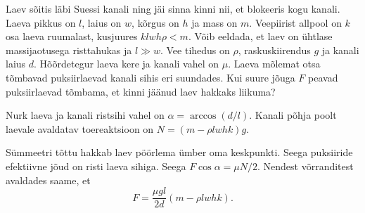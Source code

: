 
Laev sõitis läbi Suessi kanali ning jäi sinna kinni nii, et blokeeris kogu kanali. Laeva pikkus on $l$, laius on $w$, kõrgus on $h$ ja mass on $m$. Veepiirist allpool on $k$ osa laeva ruumalast, kusjuures $klwh\rho < m$. Võib eeldada, et laev on ühtlase massijaotusega risttahukas ja $l \gg w$. Vee tihedus on $\rho$, raskuskiirendus $g$ ja kanali laius $d$. Hõõrdetegur laeva kere ja kanali vahel on $\mu$. Laeva mõlemat otsa tõmbavad puksiirlaevad kanali sihis eri suundades. Kui suure jõuga $F$ peavad puksiirlaevad tõmbama, et kinni jäänud laev hakkaks liikuma?


\hint

\solu
\par
Nurk laeva ja kanali ristsihi vahel on $ \alpha = \arccos (d/l)$. Kanali põhja poolt laevale avaldatav toereaktsioon on $N = (m-\rho lwh k) g$.

Sümmeetri tõttu hakkab laev pöörlema ümber oma keskpunkti. Seega puksiiride efektiivne jõud on risti laeva sihiga. Seega $F \cos \alpha = \mu N/2$. Nendest võrranditest avaldades saame, et
\begin{equation*}
F=\frac{\mu g l}{2d} (m-\rho l w h k).
\end{equation*}
\probend